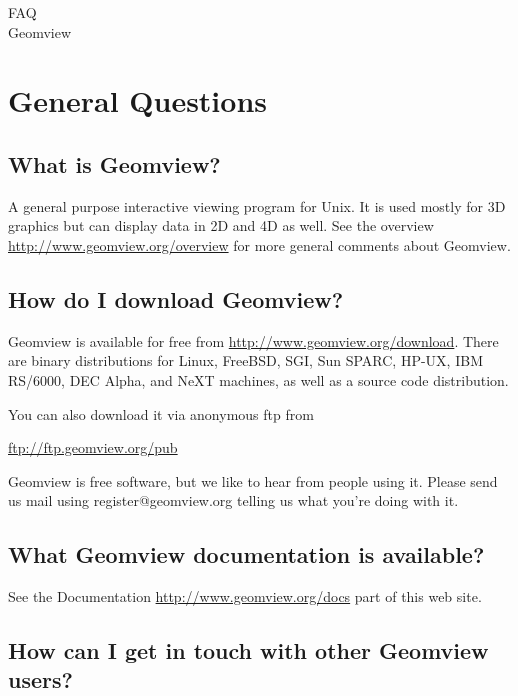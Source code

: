 \documentclass[12pt,a4paper]{article}
\begin{document}
\vspace*{6cm}
\huge
\begin{center}
FAQ\\
Geomview
\end{center}
\normalsize
\newpage
\tableofcontents
\newpage

\section{General Questions}

    \subsection{What is Geomview?}

A general purpose interactive viewing program for Unix. It is used
mostly for 3D graphics but can display data in 2D and 4D as well. See
the overview \url{http://www.geomview.org/overview} for more general
comments about Geomview.

    \subsection{How do I download Geomview?}

        Geomview is available for free from \url{http://www.geomview.org/download}.
        There are binary distributions for Linux, FreeBSD, SGI, Sun SPARC,
        HP-UX, IBM RS/6000, DEC Alpha, and NeXT machines, as well as a source
        code distribution.

        You can also download it via anonymous ftp from
        
        \url{ftp://ftp.geomview.org/pub}

        Geomview is free software, but we like to hear from people using it.
        Please send us mail using register@geomview.org telling us what
        you're doing with it.

    \subsection{What Geomview documentation is available?}

        See the Documentation \url{http://www.geomview.org/docs} part of this web site.

    \subsection{How can I get in touch with other Geomview users?}
\end{document}
